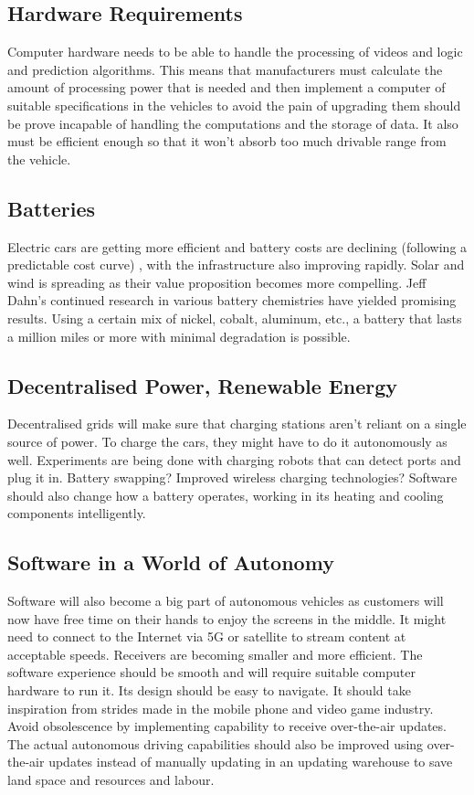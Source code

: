\documentclass{article}
\begin{document}
\subsection{Hardware Requirements}

Computer hardware needs to be able to handle the processing of videos and logic and prediction algorithms. This means that manufacturers must calculate the amount of processing power that is needed and then implement a computer of suitable specifications in the vehicles to avoid the pain of upgrading them should be prove incapable of handling the computations and the storage of data. It also must be efficient enough so that it won’t absorb too much drivable range from the vehicle. 

\subsection{Batteries}

Electric cars are getting more efficient and battery costs are declining (following a predictable cost curve) , with the infrastructure also improving rapidly. Solar and wind is spreading as their value proposition becomes more compelling. Jeff Dahn’s continued research in various battery chemistries have yielded promising results. Using a certain mix of nickel, cobalt, aluminum, etc., a battery that lasts a million miles or more with minimal degradation is possible.  

\subsection{Decentralised Power, Renewable Energy}

Decentralised grids will make sure that charging stations aren’t reliant on a single source of power. To charge the cars, they might have to do it autonomously as well. Experiments are being done with charging robots that can detect ports and plug it in. Battery swapping? Improved wireless charging technologies? Software should also change how a battery operates, working in its heating and cooling components intelligently. 

\subsection{Software in a World of Autonomy}

Software will also become a big part of autonomous vehicles as customers will now have free time on their hands to enjoy the screens in the middle. It might need to connect to the Internet via 5G or satellite to stream content at acceptable speeds. Receivers are becoming smaller and more efficient. The software experience should be smooth and will require suitable computer hardware to run it. Its design should be easy to navigate. It should take inspiration from strides made in the mobile phone and video game industry. Avoid obsolescence by implementing capability to receive over-the-air updates. The actual autonomous driving capabilities should also be improved using over-the-air updates instead of manually updating in an updating warehouse to save land space and resources and labour. 
\end{document}
